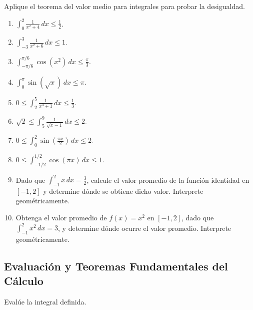 \documentclass[12pt]{article}
\begin{document}
Aplique el teorema del valor medio para integrales para probar la desigualdad.

\begin{enumerate}
\item $\displaystyle \int_0^2\frac1{x^2+4}\,dx\le\frac12$.
\item $\displaystyle \int_{-3}^{3}\frac1{x^2+6}\,dx\le1$.
\item $\displaystyle \int_{-\pi/6}^{\pi/6}\cos(x^2)\,dx\le\frac\pi3$.
\item $\displaystyle \int_0^\pi\sin(\sqrt{x})\,dx\le\pi$.
\item $\displaystyle 0\le\int_2^5\frac1{x^3+1}\,dx\le\frac13$.
\item $\displaystyle \sqrt2\le\int_5^9\frac1{\sqrt{x-1}}\,dx\le2$.
\item $\displaystyle 0\le\int_0^2\sin\left(\frac{\pi x}{2}\right)\,dx\le2$.
\item $\displaystyle 0\le\int_{-1/2}^{1/2}\cos(\pi x)\,dx\le1$.
\item Dado que $\displaystyle \int_{-1}^{2}x\,dx=\frac32$, calcule el valor promedio de la función identidad en $[-1,2]$ y determine dónde se obtiene dicho valor. Interprete geométricamente.
\item Obtenga el valor promedio de $f(x)=x^2$ en $[-1,2]$, dado que $\displaystyle \int_{-1}^{2}x^2\,dx=3$, y determine dónde ocurre el valor promedio. Interprete geométricamente.
\end{enumerate}

\subsection*{Evaluación y Teoremas Fundamentales del Cálculo}

Evalúe la integral definida.
\end{document}
